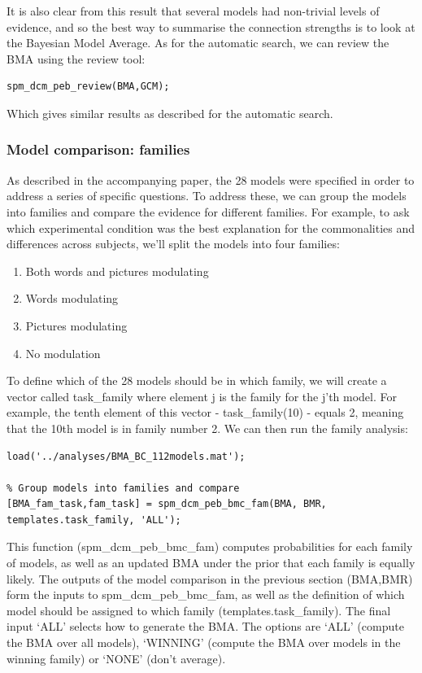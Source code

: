 \documentclass{article}
\begin{document}
It is also clear from this result that several models had non-trivial levels of evidence, and so the best way to summarise the connection strengths is to look at the Bayesian Model Average. As for the automatic search, we can review the BMA using the review tool:

\begin{lstlisting}[style=Matlab-editor,caption=PEB review tool]
% Review the BMA
spm_dcm_peb_review(BMA,GCM);
\end{lstlisting}

Which gives similar results as described for the automatic search.

\subsubsection{Model comparison: families}
As described in the accompanying paper, the 28 models were specified in order to address a series of specific questions. To address these, we can group the models into families and compare the evidence for different families. For example, to ask which experimental condition was the best explanation for the commonalities and differences across subjects, we'll split the models into four families:

\begin{enumerate}
    \item Both words and pictures modulating
    \item Words modulating
    \item Pictures modulating
    \item No modulation
\end{enumerate}

To define which of the 28 models should be in which family, we will create a vector called task\_family where element j is the family for the j'th model. For example, the tenth element of this vector - task\_family(10) - equals 2, meaning that the 10th model is in family number 2. We can then run the family analysis:

\begin{lstlisting}[style=Matlab-editor,caption=Family comparison]
% Load the result from the comparison of 28 reduced models
load('../analyses/BMA_BC_112models.mat');

% Group models into families and compare
[BMA_fam_task,fam_task] = spm_dcm_peb_bmc_fam(BMA, BMR, templates.task_family, 'ALL');
\end{lstlisting}

This function (spm\_dcm\_peb\_bmc\_fam) computes probabilities for each family of models, as well as an updated BMA under the prior that each family is equally likely. The outputs of the model comparison in the previous section (BMA,BMR) form the inputs to spm\_dcm\_peb\_bmc\_fam, as well as the definition of which model should be assigned to which family (templates.task\_family). The final input `ALL' selects how to generate the BMA. The options are `ALL' (compute the BMA over all models), `WINNING' (compute the BMA over models in the winning family) or `NONE' (don't average). 
\end{document}
